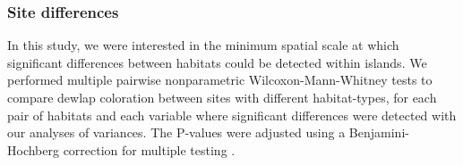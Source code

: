 \subsubsection*{Site differences}

In this study, we were interested in the minimum spatial scale at which significant differences between habitats could be detected within islands. We performed multiple pairwise nonparametric Wilcoxon-Mann-Whitney tests \citep{Hollander2013} to compare dewlap coloration between sites with different habitat-types, for each pair of habitats and each variable where significant differences were detected with our analyses of variances. The P-values were adjusted using a Benjamini-Hochberg correction for multiple testing \citep{Benjamini1995}.